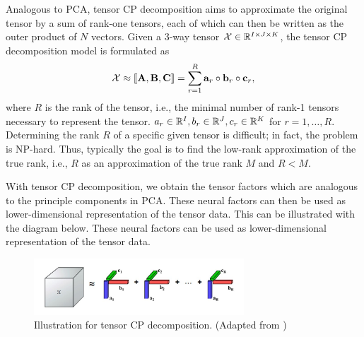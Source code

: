 Analogous to PCA, tensor CP decomposition aims to approximate the original tensor by a sum of rank-one tensors, each of which can then be written as the outer product of $N$ vectors. Given a $3$-way tensor $\mathcal{X} \in \mathbb R^{I\times J\times K}$, the tensor CP decomposition model is formulated as
\begin{align}
    \mathcal{X} \approx [\![ \mathbf{A}, \mathbf{B}, \mathbf{C} ]\!] = \sum_{r=1}^R \mathbf{a}_r \circ \mathbf{b}_r \circ \mathbf{c}_r,
\end{align}
where $R$ is the rank of the tensor, i.e., the minimal number of rank-1 tensors necessary to represent the tensor. $a_r \in \mathbb R^I, b_r \in \mathbb R^J, c_r \in \mathbb R^K$ for $r = 1,\dots, R.$ Determining the rank $R$ of a specific given tensor is difficult; in fact, the problem is NP-hard. Thus, typically the goal is to find the low-rank approximation of the true rank, i.e., $R$ as an approximation of the true rank $M$ and $R < M$.


With tensor CP decomposition, we obtain the tensor factors which are analogous to the principle components in PCA. These neural factors can then be used as lower-dimensional representation of the tensor data. This can be illustrated with the diagram below. These neural factors can be used as lower-dimensional representation of the tensor data.
\begin{figure}[H]
    \centering
        \includegraphics[width=0.7\textwidth]{figures/linear/tca.jpg}
        \caption{Illustration for tensor CP decomposition. (Adapted from \cite{williams_unsupervised_2018})}
    \end{figure} 

